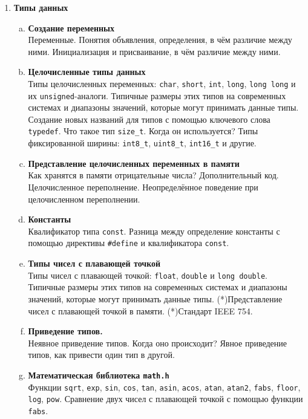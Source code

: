 \documentclass{article}
\begin{document}
\begin{enumerate}
   
\item \textbf{Типы данных}\\   


\begin{enumerate}[a.]
\item \textbf{Создание переменных}\\
Переменные. Понятия объявления, определения, в чём различие между ними. Инициализация и присваивание, в чём различие между ними.

\item \textbf{Целочисленные типы данных}\\
Типы целочисленных переменных: \texttt{char}, \texttt{short}, \texttt{int}, \texttt{long}, \texttt{long long} и их \texttt{unsigned}-аналоги. Типичные размеры этих типов на современных системах и диапазоны значений, которые могут принимать данные типы. Создание новых названий для типов с помощью ключевого слова \texttt{typedef}. Что такое тип \texttt{size\_t}. Когда он используется? Типы фиксированной ширины: \texttt{int8\_t}, \texttt{uint8\_t}, \texttt{int16\_t} и другие.

\item \textbf{Представление целочисленных переменных в памяти}\\
Как хранятся в памяти отрицательные числа? Дополнительный код.  Целочисленное переполнение. Неопределённое поведение при целочисленном переполнении.

\item \textbf{Константы}\\
Квалификатор типа \texttt{const}. Разница между определение константы с помощью директивы \texttt{\#define} и квалификатора \texttt{const}.

\item \textbf{Типы чисел с плавающей точкой}\\
Типы чисел с плавающей точкой: \texttt{float}, \texttt{double} и \texttt{long double}. Типичные размеры этих типов на современных системах и диапазоны значений, которые могут принимать данные типы. (*)Представление чисел с плавающей точкой в памяти. (*)Стандарт IEEE 754.

\item \textbf{Приведение типов.}\\
Неявное приведение типов. Когда оно происходит? Явное приведение типов, как привести один тип в другой.

\item \textbf{Математическая библиотека \texttt{math.h}}\\
Функции \texttt{sqrt}, \texttt{exp}, \texttt{sin}, \texttt{cos}, \texttt{tan}, \texttt{asin}, \texttt{acos}, \texttt{atan}, \texttt{atan2}, \texttt{fabs}, \texttt{floor}, \texttt{log}, \texttt{pow}. Сравнение двух чисел с плавающей точкой с помощью функции \texttt{fabs}.
\end{enumerate}




\end{enumerate}
\end{document}
